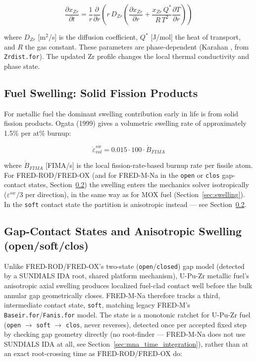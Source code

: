 \begin{refsection}
\begin{equation}
  \frac{\partial x_{Zr}}{\partial t}
  = \frac{1}{r}\frac{\partial}{\partial r}
    \!\left(r\,D_{Zr}\left(\frac{\partial x_{Zr}}{\partial r}
    + \frac{x_{Zr}\,Q^*}{R\,T^2}\frac{\partial T}{\partial r}\right)\right)
  \label{eq:zrdist}
\end{equation}

where $D_{Zr}$ [m$^2$/s] is the diffusion coefficient, $Q^*$ [J/mol] the heat of transport, and $R$ the gas constant.  These parameters are phase-dependent (Karahan \cite{karahan2009}, from \texttt{Zrdist.for}).  The updated Zr profile changes the local thermal conductivity and phase state.

\subsection{Fuel Swelling: Solid Fission Products}
\label{sec:upuzr_swelling}

For metallic fuel the dominant swelling contribution early in life is from solid fission products.  Ogata (1999) \cite{ogata1999} gives a volumetric swelling rate of approximately 1.5\% per at\% burnup:

\begin{equation}
  \dot{\varepsilon}^{sw}_{vol} = 0.015 \cdot 100 \cdot \dot{B}_{FIMA}
  \label{eq:swel_metallic}
\end{equation}

where $\dot{B}_{FIMA}$ [FIMA/s] is the local fission-rate-based burnup rate per fissile atom.  For FRED-ROD/FRED-OX (and for FRED-M-Na in the \texttt{open} or \texttt{clos} gap-contact states, Section~\ref{sec:upuzr_gap_states}) the swelling enters the mechanics solver isotropically ($\varepsilon^{sw}/3$ per direction), in the same way as for MOX fuel (Section~\ref{sec:swelling}). In the \texttt{soft} contact state the partition is anisotropic instead — see Section~\ref{sec:upuzr_gap_states}.

\subsection{Gap-Contact States and Anisotropic Swelling (open/soft/clos)}
\label{sec:upuzr_gap_states}

Unlike FRED-ROD/FRED-OX's two-state (\texttt{open}/\texttt{closed}) gap model (detected by a SUNDIALS IDA root, shared platform mechanism), U-Pu-Zr metallic fuel's anisotropic axial swelling produces localized fuel-clad contact well before the bulk annular gap geometrically closes. FRED-M-Na therefore tracks a third, intermediate contact state, \texttt{soft}, matching legacy FRED-M's \texttt{Baseir.for}/\texttt{Fanis.for} model. The state is a monotonic ratchet for U-Pu-Zr fuel (\texttt{open} $\to$ \texttt{soft} $\to$ \texttt{clos}, never reverses), detected once per accepted fixed step by checking gap geometry directly (no root-finder --- FRED-M-Na does not use SUNDIALS IDA at all, see Section~\ref{sec:mna_time_integration}), rather than at an exact root-crossing time as FRED-ROD/FRED-OX do:


\end{refsection}
